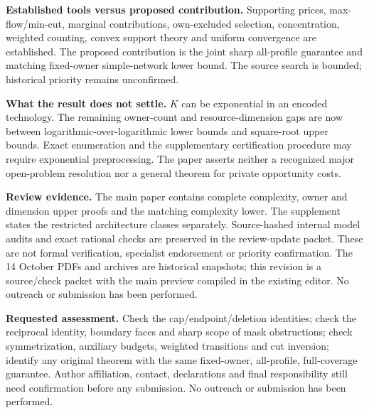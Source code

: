 \documentclass[11pt]{article}
\begin{document}
\textbf{Established tools versus proposed contribution.} Supporting prices,
max-flow/min-cut, marginal contributions, own-excluded selection,
concentration, weighted counting, convex support theory and uniform
convergence are established. The proposed contribution is the joint sharp
all-profile guarantee and matching fixed-owner simple-network lower bound.
The source search is bounded; historical priority remains unconfirmed.

\textbf{What the result does not settle.} $K$ can be exponential in an encoded
technology. The remaining owner-count and resource-dimension gaps are now between logarithmic-over-logarithmic lower bounds and square-root upper bounds.
Exact enumeration and the supplementary certification procedure may require
exponential preprocessing. The paper asserts neither a recognized major
open-problem resolution nor a general theorem for private opportunity costs.

\textbf{Review evidence.} The main paper contains complete complexity, owner
and dimension upper proofs and the matching complexity lower. The supplement
states the restricted architecture classes separately. Source-hashed internal
model audits and exact rational checks are preserved in the review-update
packet. These are not formal verification, specialist endorsement or priority
confirmation. The 14 October PDFs and archives are historical snapshots;
this revision is a source/check packet with the main preview compiled in the
existing editor. No outreach or submission has been performed.

\textbf{Requested assessment.} Check the cap/endpoint/deletion identities;
check the reciprocal identity, boundary faces and sharp scope of mask obstructions;
check symmetrization, auxiliary budgets, weighted transitions and cut inversion;
identify any original theorem with the same fixed-owner, all-profile,
full-coverage guarantee. Author affiliation, contact, declarations and final
responsibility still need confirmation before any submission. No outreach
or submission has been performed.
\end{document}
